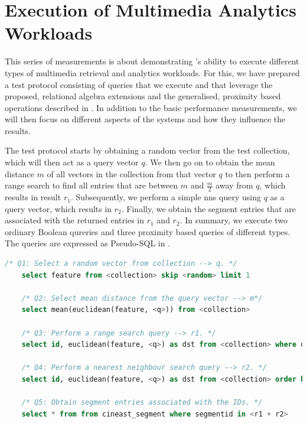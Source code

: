 \section{Execution of Multimedia Analytics Workloads}
\label{section:evaluation_analytics}

This series of measurements is about demonstrating \cottontail{}'s ability to execute different types of multimedia retrieval and analytics workloads. For this, we have prepared a test protocol consisting of queries that we execute and that leverage the proposed, relational algebra extensions and the generalised, proximity based operations described in . In addition to the basic performance measurements, we will then focus on different aspects of the systems and how they influence the results.

The test protocol starts by obtaining a random vector from the test collection, which will then act as a query vector $q$. We then go on to obtain the mean distance $m$ of all vectors in the collection from that vector $q$ to then perform a range search to find all entries that are between $m$ and $\frac{m}{2}$ away from $q$, which results in result $r_1{}$. Subsequently, we perform a simple \acrshort{nns} query using $q$ as a query vector, which results in $r_2$. Finally, we obtain the segment entries that are associated with the returned entries in $r_1$ and $r_2$. In summary, we execute two ordinary Boolean qureries and three proximity based queries of different types. The queries are expressed as Pseudo-SQL in .

\begin{lstlisting}[language=SQL, caption={Pseudo-SQL of the queries executed for the analytics workload evaluation.}, label=listing:analytics_queries, numbers=none]
    /* Q1: Select a random vector from collection --> q. */
    select feature from <collection> skip <random> limit 1
    
    /* Q2: Select mean distance from the query vector --> m*/
    select mean(euclidean(feature, <q>)) from <collection> 

    /* Q3: Perform a range search query --> r1. */
    select id, euclidean(feature, <q>) as dst from <collection> where dst BETWEEN (m/2.0, m) order by dst asc limit 1000

    /* Q4: Perform a nearest neighbour search query --> r2. */
    select id, euclidean(feature, <q>) as dst from <collection> order by dst asc limit 1000

    /* Q5: Obtain segment entries associated with the IDs. */
    select * from from cineast_segment where segmentid in <r1 + r2>
\end{lstlisting}


